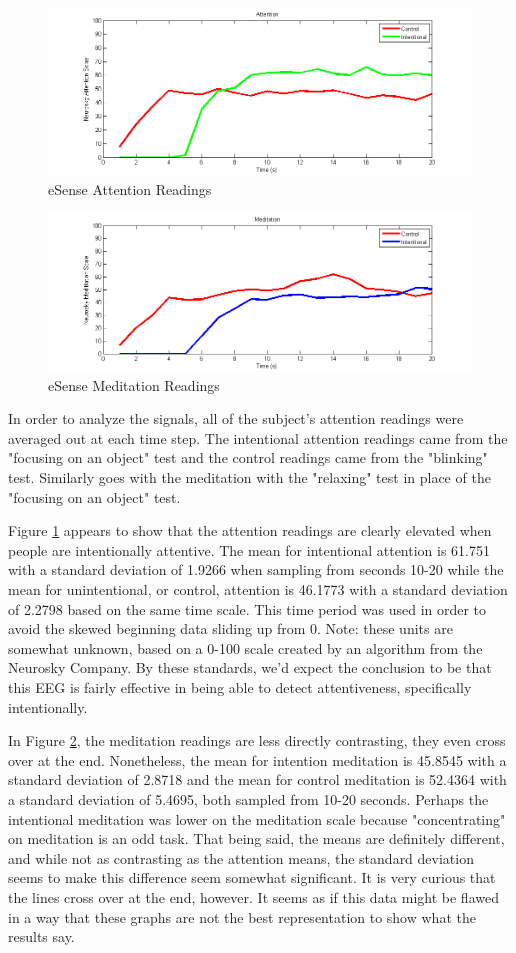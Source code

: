 \documentclass[journal]{IEEEtran}
\begin{document}
\begin{figure}[H]
    \centering
    \includegraphics[width=.5\textwidth]{EEG/Attention}
    \caption{eSense Attention Readings}
    \label{attention}
\end{figure}

\begin{figure}[H]
    \centering
    \includegraphics[width=.5\textwidth]{EEG/Meditation}
    \caption{eSense Meditation Readings}
    \label{meditation}
\end{figure} 

In order to analyze the signals, all of the subject's attention readings were averaged out at each time step. The intentional attention readings came from the "focusing on an object" test and the control readings came from the "blinking" test. Similarly goes with the meditation with the "relaxing" test in place of the "focusing on an object" test. \par 

Figure \ref{attention} appears to show that the attention readings are clearly elevated when people are intentionally attentive. The mean for intentional attention is 61.751 with a standard deviation of 1.9266 when sampling from seconds 10-20 while the mean for unintentional, or control, attention is 46.1773 with a standard deviation of 2.2798 based on the same time scale. This time period was used in order to avoid the skewed beginning data sliding up from 0. Note: these units are somewhat unknown, based on a 0-100 scale created by an algorithm from the Neurosky Company. By these standards, we'd expect the conclusion to be that this EEG is fairly effective in being able to detect attentiveness, specifically intentionally. \par

In Figure \ref{meditation}, the meditation readings are less directly contrasting, they even cross over at the end. Nonetheless, the mean for intention meditation is 45.8545 with a standard deviation of 2.8718 and the mean for control meditation is 52.4364 with a standard deviation of 5.4695, both sampled from 10-20 seconds. Perhaps the intentional meditation was lower on the meditation scale because "concentrating" on meditation is an odd task. That being said, the means are definitely different, and while not as contrasting as the attention means, the standard deviation seems to make this difference seem somewhat significant. It is very curious that the lines cross over at the end, however. It seems as if this data might be flawed in a way that these graphs are not the best representation to show what the results say.  \par
\end{document}
